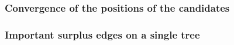 \subsubsection{Convergence of the positions of the candidates}
\begin{proposition}

\end{proposition}






\subsubsection{Important surplus edges on a single tree}




